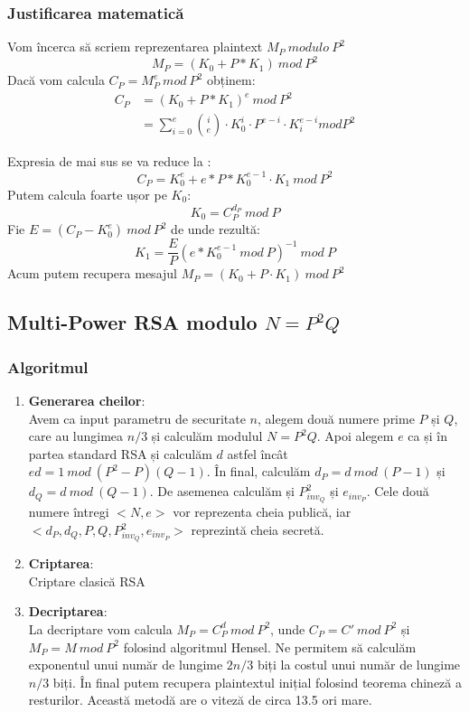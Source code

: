 \documentclass[12pt, oneside]{book}
\begin{document}
		  \subsubsection{Justificarea matematică}
		  Vom încerca să scriem reprezentarea plaintext $M_P \ modulo \ P^2$
		  $$ M_P=(K_0 + P*K_1) \ mod \ P^2$$
		  Dacă vom calcula $C_P = M_{P}^{e} \ mod \ P^2$ obținem:
		  \begin{align*}
		   C_P &= (K_0 + P*K_1)^e \ mod \ P^2 \\
		   &= \sum_{i=0}^{e} \binom ie \cdot   K_{0}^{i} \cdot   P^{e-i} \cdot   K_{i}^{e-i} mod P^2 
		  \end{align*}
		  
		  Expresia de mai sus se va reduce la :
		  $$ C_P = K_{0}^{e}  + e*P*K_{0}^{e-1} \cdot   K_1 \ mod \ P^2 $$
		  Putem calcula foarte ușor pe $K_0$:
		  $$K_0=C_{P}^{d_P} \ mod \ P$$
		  Fie $E = (C_P - K_{0}^{e}) \ mod \ P^2$ de unde rezultă:
		  $$ K_1=\frac{E}{P} (e*K_{0}^{e-1} \ mod \ P)^{-1} \ mod \ P $$
		  Acum putem recupera mesajul $M_P = (K_0 + P \cdot   K_1) \ mod \ P^2$
		  
		  \subsection{Multi-Power RSA modulo $N=P^2Q$}
		  \subsubsection{Algoritmul}
		  \begin{enumerate}
		   \item \textbf{Generarea cheilor}: \\
		   Avem ca input parametru de securitate $n$, alegem două numere prime $P$ și $Q$, care au lungimea $n/3$ și calculăm modulul $N=P^2Q$. Apoi alegem $e$ ca și în partea standard RSA și calculăm $d$ astfel încât $ed=1 \ mod \ (P^2-P)(Q-1)$. În final, calculăm $d_P= d \ mod \ (P-1)$ și $ d_Q=d \ mod \ (Q-1)$. De asemenea calculăm și $P_{inv_Q}^{2}$ și $e_{inv_P}$. Cele două numere întregi $<N,e>$ vor reprezenta cheia publică, iar $<d_P,d_Q,P,Q,P_{inv_Q}^{2},e_{inv_P}>$ reprezintă cheia secretă. 
		   
		   \item \textbf{Criptarea}: \\
		   Criptare clasică RSA
		   
		   \item \textbf{Decriptarea}: \\
		   La decriptare vom calcula $M_P = C_{P}^{d} \ mod \ P^2$, unde $C_P = C '\ mod \ P^2$ și $M_P = M \ mod \ P^2$ folosind algoritmul Hensel. Ne permitem să calculăm exponentul unui număr de lungime $2n/3$ biți la costul unui număr de lungime $n/3$ biți. În final putem recupera plaintextul inițial folosind teorema chineză a resturilor. Această metodă are o viteză de circa 13.5 ori mare.
		  \end{enumerate}
		  
\end{document}
